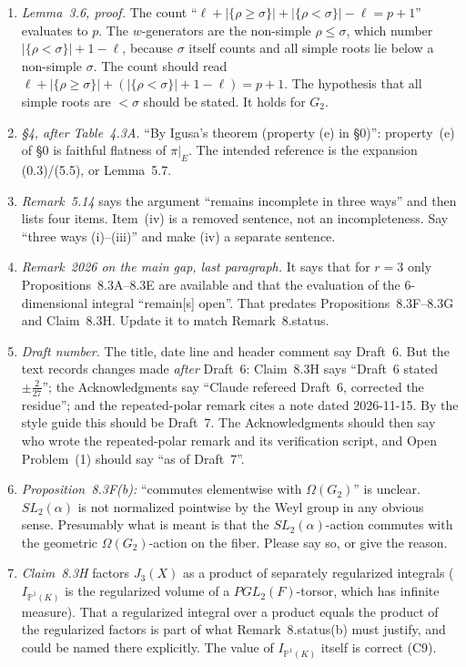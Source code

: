 \documentclass[12pt,letterpaper]{amsart}
\begin{document}
\begin{enumerate}
\item \emph{Lemma~3.6, proof.} The count
``$\ell+|\{\rho\ge\sigma\}|+|\{\rho<\sigma\}|-\ell=p+1$'' evaluates to $p$. The
$w$-generators are the non-simple $\rho\le\sigma$, which number
$|\{\rho<\sigma\}|+1-\ell$, because $\sigma$ itself counts and all simple roots
lie below a non-simple $\sigma$. The count should read
$\ell+|\{\rho\ge\sigma\}|+(|\{\rho<\sigma\}|+1-\ell)=p+1$. The hypothesis that
all simple roots are $<\sigma$ should be stated. It holds for $G_2$.
\item \emph{\S4, after Table~4.3A.} ``By Igusa's theorem (property (e) in
\S0)'': property~(e) of \S0 is faithful flatness of $\pi|_E$. The intended
reference is the expansion (0.3)/(5.5), or
Lemma~5.7.
\item \emph{Remark~5.14} says the argument ``remains incomplete in three ways''
and then lists four items. Item~(iv) is a removed sentence, not an
incompleteness. Say ``three ways (i)--(iii)'' and make (iv) a separate
sentence.
\item \emph{Remark~2026 on the main gap, last paragraph.} It says that for
$r=3$ only Propositions~8.3A--8.3E are available and that the evaluation of
the $6$-dimensional integral ``remain[s] open''. That predates
Propositions~8.3F--8.3G and Claim~8.3H. Update it to match Remark~8.status.
\item \emph{Draft number.} The title, date line and header comment say
Draft~6. But the text records changes made \emph{after} Draft~6: Claim~8.3H
says ``Draft~6 stated $\pm\frac{2}{27}$''; the Acknowledgments say
``Claude refereed Draft~6, corrected the residue''; and the repeated-polar
remark cites a note dated 2026-11-15. By the style guide this should be
Draft~7. The Acknowledgments should then say who wrote the repeated-polar
remark and its verification script, and Open Problem~(1) should say
``as of Draft~7''.
\item \emph{Proposition~8.3F(b):} ``commutes elementwise with $\Omega(G_2)$''
is unclear. $SL_2(\alpha)$ is not normalized pointwise by the Weyl group in
any obvious sense. Presumably what is meant is that the $SL_2(\alpha)$-action
commutes with the geometric $\Omega(G_2)$-action on the fiber. Please say so,
or give the reason.
\item \emph{Claim~8.3H} factors $J_3(X)$ as a product of separately
regularized integrals ($I_{\mathbb P^1(K)}$ is the regularized volume of a
$PGL_2(F)$-torsor, which has infinite measure). That a regularized integral
over a product equals the product of the regularized factors is part of what
Remark~8.status(b) must justify, and could be named there explicitly. The
value of $I_{\mathbb P^1(K)}$ itself is correct (C9).
\end{enumerate}
\end{document}
